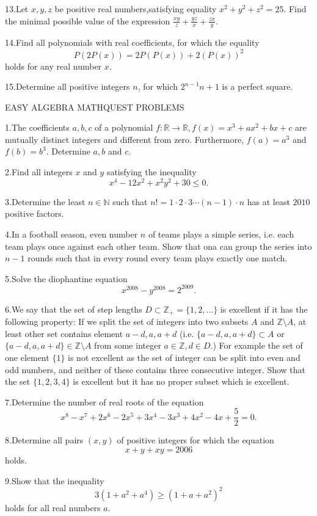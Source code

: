 \documentclass{article}
\begin{document}
13.Let $ x,y,z$ be positive real numbers,satisfying equality $ x^{2}+y^{2}+z^{2}=25$. Find the minimal possible value of the expression $ \frac{xy}{z} + \frac{yz}{x} + \frac{zx}{y}$.

14.Find all polynomials with real coefficients, for which the equality
\[ P(2P(x)) = 2P(P(x)) + 2(P(x))^{2}\]
holds for any real number $ x$.

15.Determine all positive integers $ n$, for which $ 2^{n-1}n+1$ is a perfect square.

EASY ALGEBRA MATHQUEST PROBLEMS

1.The coefficients $a,b,c$ of a polynomial $f:\mathbb{R}\to\mathbb{R}, f(x)=x^3+ax^2+bx+c$ are mutually distinct integers and different from zero. Furthermore, $f(a)=a^3$ and $f(b)=b^3.$ Determine $a,b$ and $c$.

2.Find all integers $x$ and $y$ satisfying the inequality \[x^4-12x^2+x^2y^2+30\leq 0.\]

3.Determine the least $n\in\mathbb{N}$ such that $n!=1\cdot 2\cdot 3\cdots (n-1)\cdot n$ has at least $2010$ positive factors.

4.In a football season, even number $n$ of teams plays a simple series, i.e. each team plays once against each other team. Show that ona can group the series into $n-1$ rounds such that in every round every team plays exactly one match.

5.Solve the diophantine equation \[x^{2008}- y^{2008} = 2^{2009}.\]

6.We say that the set of step lengths $D\subset \mathbb{Z}_+=\{1,2,\ldots\}$ is excellent if it has the following property: If we split the set of integers into two subsets $A$ and $\mathbb{Z}\setminus{A}$, at least other set contains element $a-d,a,a+d$ (i.e. $\{a-d,a,a+d\} \subset A$ or $\{a-d,a,a+d\}\in \mathbb{Z}\setminus A$ from some integer $a\in \mathbb{Z},d\in D$.) For example the set of one element $\{1\}$ is not excellent as the set of integer can be split into even and odd numbers, and neither of these contains three consecutive integer. Show that the set $\{1,2,3,4\}$ is excellent but it has no proper subset which is excellent.

7.Determine the number of real roots of the equation \[x^8 - x^7 + 2x^6 - 2x^5 + 3x^4 - 3x^3 + 4x^2 - 4x +\frac{5}{2}= 0.\]

8.Determine all pairs $(x, y)$ of positive integers for which the equation \[x + y + xy = 2006\] holds.

9.Show that the inequality \[3(1 + a^2 + a^4)\geq  (1 + a + a^2)^2\]
holds for all real numbers $a.$
\end{document}
